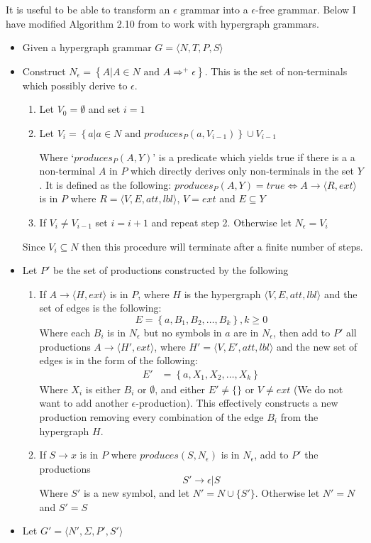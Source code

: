 It is useful to be able to transform an $\epsilon$ grammar into a $\epsilon$-free grammar. Below I have modified Algorithm 2.10 from \citet{Aho} to work with hypergraph grammars.

\begin{itemize}
\item Given a hypergraph grammar $G = \langle N, T, P, S \rangle$
\item Construct $N_\epsilon = \left\{A | A \in N \textrm{ and } A \Rightarrow^{+} \epsilon \right\}$. This is the set of non-terminals which possibly derive to $\epsilon$.

\begin{enumerate}
\item Let $V_0 = \emptyset$ and set $i = 1$
\item Let $V_i = \left\{a| a \in N \textrm{ and } produces_P(a, V_{i-1})\right\} \cup V_{i-1}$

Where `$produces_P(A, Y)$' is a predicate which yields true if there is a a non-terminal $A$ in $P$ which directly derives only non-terminals in the set $Y$. It is defined as the following: $produces_P(A, Y) = true \iff A \to \langle R, ext \rangle$ is in $P$ where $R = \langle V, E, att, lbl\rangle$, $V = ext$ and $E \subseteq Y$ 
\item If $V_i \neq V_{i-1}$ set $i=i+1$ and repeat step 2. Otherwise let $N_\epsilon = V_i$
\end{enumerate}
Since $V_i \subseteq N$ then this procedure will terminate after a finite number of steps.
\item Let $P'$ be the set of productions constructed by the following
\begin{enumerate}
\item If $A \to \langle H, ext \rangle$ is in $P$, where $H$ is the hypergraph $\langle V, E, att, lbl\rangle$ and the set of edges is the following:
\[E = \left\{ a, B_1, B_2, \dots, B_k\right\}, k \geq 0\]
Where each $B_i$ is in $N_\epsilon$ but no symbols in $a$ are in $N_\epsilon$, then add to $P'$ all productions $A \to \langle H', ext \rangle$, where $H' =  \langle V, E', att, lbl\rangle$ and the new set of edges is in the form of the following:
\begin{align*}
E' &= \left\{ a, X_1, X_2, \dots, X_k \right\}
\end{align*}
Where $X_i$ is either $B_i$ or $\emptyset$, and either $E' \neq \{\}$ or $V \neq ext$ (We do not want to add another $\epsilon$-production). This effectively constructs a new production removing every combination of the edge $B_i$ from the hypergraph $H$.
\item If $S \to x$ is in $P$ where $produces(S, N_\epsilon)$ is in $N_\epsilon$, add to $P'$ the productions
\[S' \to \epsilon|S\]
Where $S'$ is a new symbol, and let $N' = N \cup \{S'\}$. Otherwise let $N' = N$ and $S' = S$
\end{enumerate}
\item Let $G' = \langle N', \Sigma, P', S' \rangle$
\end{itemize}

